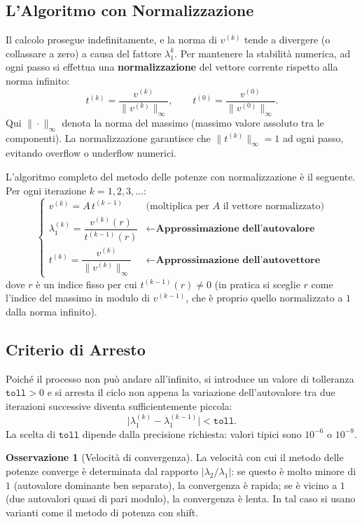 \documentclass[a4paper,12pt]{article}
\theoremstyle{definition}
\newtheorem{osservazione}{Osservazione}[section]
\theoremstyle{remark}
\begin{document}
\subsection{L'Algoritmo con Normalizzazione}

Il calcolo prosegue indefinitamente, e la norma di $v^{(k)}$ tende a divergere (o collassare
a zero) a causa del fattore $\lambda_1^k$. Per mantenere la stabilità numerica, ad ogni passo
si effettua una \textbf{normalizzazione} del vettore corrente rispetto alla norma infinito:
\[
  t^{(k)} = \frac{v^{(k)}}{\|v^{(k)}\|_\infty},
  \qquad
  t^{(0)} = \frac{v^{(0)}}{\|v^{(0)}\|_\infty}.
\]
Qui $\|\cdot\|_\infty$ denota la norma del massimo (massimo valore assoluto tra le componenti).
La normalizzazione garantisce che $\|t^{(k)}\|_\infty = 1$ ad ogni passo, evitando overflow o
underflow numerici.

\medskip
\noindent L'algoritmo completo del metodo delle potenze con normalizzazione è il seguente.
Per ogni iterazione $k = 1, 2, 3, \ldots$:
\[
  \begin{cases}
    v^{(k)} = A\,t^{(k-1)} & \text{(moltiplica per $A$ il vettore normalizzato)}\\[6pt]
    \lambda_1^{(k)} = \dfrac{v^{(k)}(r)}{t^{(k-1)}(r)}
      & \leftarrow \textbf{Approssimazione dell'autovalore}\\[10pt]
    t^{(k)} = \dfrac{v^{(k)}}{\|v^{(k)}\|_\infty}
      & \leftarrow \textbf{Approssimazione dell'autovettore}
  \end{cases}
\]
dove $r$ è un indice fisso per cui $t^{(k-1)}(r) \neq 0$ (in pratica si sceglie $r$ come
l'indice del massimo in modulo di $v^{(k-1)}$, che è proprio quello normalizzato a $1$ dalla
norma infinito).

\subsection{Criterio di Arresto}

Poiché il processo non può andare all'infinito, si introduce un valore di tolleranza
$\mathtt{toll} > 0$ e si arresta il ciclo non appena la variazione dell'autovalore tra due
iterazioni successive diventa sufficientemente piccola:
\[
  \boxed{\bigl|\lambda_1^{(k)} - \lambda_1^{(k-1)}\bigr| < \mathtt{toll}.}
\]
La scelta di $\mathtt{toll}$ dipende dalla precisione richiesta: valori tipici sono
$10^{-6}$ o $10^{-8}$.

\begin{osservazione}[Velocità di convergenza]
La velocità con cui il metodo delle potenze converge è determinata dal rapporto
$|\lambda_2 / \lambda_1|$: se questo è molto minore di $1$ (autovalore dominante ben
separato), la convergenza è rapida; se è vicino a $1$ (due autovalori quasi di pari modulo),
la convergenza è lenta. In tal caso si usano varianti come il metodo di potenza con shift.
\end{osservazione}
\end{document}
